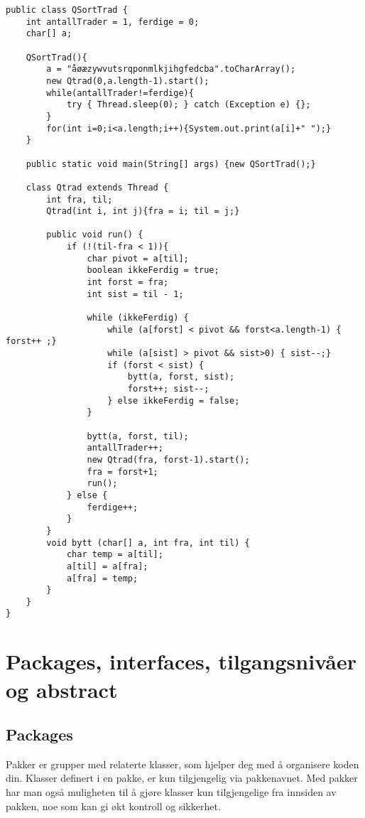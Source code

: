 \documentclass[11pt]{article}
\begin{document}
\begin{verbatim}
public class QSortTrad {
    int antallTrader = 1, ferdige = 0;
    char[] a;

    QSortTrad(){
        a = "åøæzywvutsrqponmlkjihgfedcba".toCharArray();
        new Qtrad(0,a.length-1).start();
        while(antallTrader!=ferdige){
            try { Thread.sleep(0); } catch (Exception e) {};
        }
        for(int i=0;i<a.length;i++){System.out.print(a[i]+" ");}
    }
    
    public static void main(String[] args) {new QSortTrad();}

    class Qtrad extends Thread {
        int fra, til;
        Qtrad(int i, int j){fra = i; til = j;}

        public void run() {
            if (!(til-fra < 1)){
                char pivot = a[til];
                boolean ikkeFerdig = true;
                int forst = fra; 
                int sist = til - 1;

                while (ikkeFerdig) {
                    while (a[forst] < pivot && forst<a.length-1) { forst++ ;}
                    while (a[sist] > pivot && sist>0) { sist--;}
                    if (forst < sist) { 
                        bytt(a, forst, sist);
                        forst++; sist--;
                    } else ikkeFerdig = false; 
                }
        
                bytt(a, forst, til);
                antallTrader++;
                new Qtrad(fra, forst-1).start();
                fra = forst+1;
                run();
            } else { 
                ferdige++;
            }
        }
        void bytt (char[] a, int fra, int til) {
            char temp = a[til];
            a[til] = a[fra];
            a[fra] = temp;
        }
    }
}
\end{verbatim}
\section{Packages, interfaces, tilgangsnivåer og abstract}
\label{sec-13}
\subsection{Packages}
\label{sec-13_1}

Pakker er grupper med relaterte klasser, som hjelper deg med å 
organisere koden din. Klasser definert i en pakke, er kun tilgjengelig
via pakkenavnet. Med pakker har man også muligheten til å gjøre
klasser kun tilgjengelige fra innsiden av pakken, noe som kan gi økt
kontroll og sikkerhet. 
\end{document}
